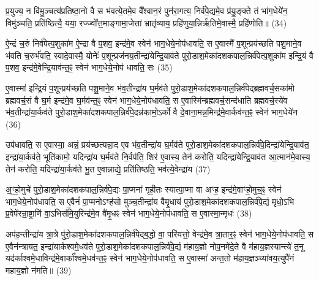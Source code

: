 प्र॒युज्य॒ न वि॑मु॒ञ्चत्य॑प्रतिष्ठा॒नो वै स भ॑वत्ये॒तमे॒व वै᳚श्वान॒रं पुन॑रा॒गत्य॒ निर्व॑पे॒द्यमे॒व प्र॑यु॒ङ्क्ते तं भा॑ग॒धेये॑न॒ विमु॑ञ्चति॒ प्रति॑ष्ठित्यै॒ यया॒ रज्ज्वो᳚त्त॒माङ्गामा॒जेत्तां भ्रातृ॑व्याय॒ प्रहि॑णुया॒न्निर्\mbox{}ऋ॑तिमे॒वास्मै॒ प्रहि॑णोति॥ (34)

{\anuvakamend{नि॒र्व॒रु॒णं व॑पेदुभ॒याद॒द्यो वै सं॑ वथ्स॒रꣳ षट्त्रिꣳ॑शच्च।]}}

ऐ॒न्द्रं च॒रुं निर्व॑पेत्प॒शुका॑म ऐ॒न्द्रा वै प॒शव॒ इन्द्र॑मे॒व स्वेन॑ भाग॒धेये॒नोप॑धावति॒ स ए॒वास्मै॑ प॒शून्प्रय॑च्छति पशु॒माने॒व भ॑वति च॒रुर्भ॑वति॒ स्वादे॒वास्मै॒ योनेः᳚ प॒शून्प्रज॑नय॒तीन्द्रा॑येन्द्रि॒याव॑ते पुरो॒डाश॒मेका॑दशकपाल॒न्निर्व॑पेत्प॒शुका॑म इन्द्रि॒यं वै प॒शव॒ इन्द्र॑मे॒वेन्द्रि॒याव॑न्त॒ꣴ॒ स्वेन॑ भाग॒धेये॒नोप॑ धावति॒ सः (35)

ए॒वास्मा॑ इन्द्रि॒यं प॒शून्प्रय॑च्छति पशु॒माने॒व भ॑व॒तीन्द्रा॑य घ॒र्मव॑ते पुरो॒डाश॒मेका॑दशकपाल॒न्निर्व॑पेद्ब्रह्मवर्च॒सका॑मो ब्रह्मवर्च॒सं वै घ॒र्म इन्द्र॑मे॒व घ॒र्मव॑न्त॒ꣴ॒ स्वेन॑ भाग॒धेये॒नोप॑धावति॒ स ए॒वास्मि॑न्ब्रह्मवर्च॒सन्द॑धाति ब्रह्मवर्च॒स्ये॑व भ॑व॒तीन्द्रा॑या॒र्कव॑ते पुरो॒डाश॒मेका॑दशकपाल॒न्निर्व॑पे॒दन्न॑कामो॒\-ऽर्को वै दे॒वाना॒मन्न॒मिन्द्र॑मे॒वार्कव॑न्त॒ꣴ॒ स्वेन॑ भाग॒धेये॑न (36)

उप॑धावति॒ स ए॒वास्मा॒ अन्नं॒ प्रय॑च्छत्यन्ना॒द ए॒व भ॑व॒तीन्द्रा॑य घ॒र्मव॑ते पुरो॒डाश॒मेका॑दशकपाल॒न्निर्व॑पे॒दिन्द्रा॑येन्द्रि॒याव॑त॒ इन्द्रा॑या॒र्कव॑ते॒ भूति॑कामो॒ यदिन्द्रा॑य घ॒र्मव॑ते नि॒र्वप॑ति॒ शिर॑ ए॒वास्य॒ तेन॑ करोति॒ यदिन्द्रा॑येन्द्रि॒याव॑त आ॒त्मान॑मे॒वास्य॒ तेन॑ करोति॒ यदिन्द्रा॑या॒र्कव॑ते भू॒त ए॒वान्नाद्ये॒ प्रति॑तिष्ठति॒ भव॑त्ये॒वेन्द्रा॑य (37)

अ॒ꣳ॒हो॒मुचे॑ पुरो॒डाश॒मेका॑दशकपाल॒न्निर्व॑पे॒द्यः पा॒प्मना॑ गृही॒तः स्यात्पा॒प्मा वा अꣳह॒ इन्द्र॑मे॒वाꣳहो॒मुच॒ꣴ॒ स्वेन॑ भाग॒धेये॒नोप॑धावति॒ स ए॒वैनं॑ पा॒प्मनो\-ऽꣳह॑सो मुञ्च॒तीन्द्रा॑य वैमृ॒धाय॑ पुरो॒डाश॒मेका॑दशकपाल॒न्निर्व॑पे॒द्यं मृधो॒\-ऽभि प्र॒वेपे॑रन्रा॒ष्ट्राणि॑ वा॒\-ऽभिस॑मि॒युरिन्द्र॑मे॒व वै॑मृ॒धꣴ स्वेन॑ भाग॒धेये॒नोप॑धावति॒ स ए॒वास्मा॒न्मृधः॑ (38)

अप॑ह॒न्तीन्द्रा॑य त्रा॒त्रे पु॑रो॒डाश॒मेका॑दशकपाल॒न्निर्व॑पेद्ब॒द्धो वा॒ परि॑यत्तो॒ वेन्द्र॑मे॒व त्रा॒तार॒ꣴ॒ स्वेन॑ भाग॒धेये॒नोप॑धावति॒ स ए॒वैन॑न्त्रायत॒ इन्द्रा॑यार्कश्वमे॒धव॑ते पुरो॒डाश॒मेका॑दशकपाल॒न्निर्व॑पे॒द्यं म॑हाय॒ज्ञो नोप॒नमे॑दे॒ते वै म॑हाय॒ज्ञस्यान्त्ये॑ त॒नू यद॑र्काश्वमे॒धाविन्द्र॑मे॒वार्का᳚श्वमे॒धव॑न्त॒ꣴ॒ स्वेन॑ भाग॒धेये॒नोप॑धावति॒ स ए॒वास्मा॑ अन्त॒तो म॑हाय॒ज्ञञ्च्या॑वय॒त्युपै॑नं महाय॒ज्ञो न॑मति॥ (39)

{\anuvakamend[{इ॒न्द्रि॒याव॑न्त॒ꣴ॒ स्वेन॑ भाग॒धेये॒नोप॑धावति॒ सो᳚\-ऽर्कव॑न्त॒ꣴ॒ स्वेन॑ भाग॒धेये॑नै॒वेन्द्रा॑यास्मा॒न्मृधो᳚\-ऽस्मै स॒प्त च॑।7।}]}

